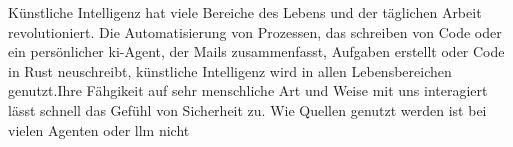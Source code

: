 \documentclass[../../main.text]{subfiles}
\begin{document}
\begin{onehalfspacing}
Künstliche Intelligenz hat viele Bereiche des Lebens und der täglichen Arbeit
revolutioniert. Die Automatisierung von Prozessen, das schreiben von Code
oder ein persönlicher \ac{ki}-Agent, der Mails zusammenfasst, Aufgaben erstellt
oder Code in Rust neuschreibt, künstliche Intelligenz wird in allen 
Lebensbereichen genutzt.Ihre Fähgikeit auf sehr menschliche Art und Weise 
mit uns interagiert lässt schnell das Gefühl von Sicherheit zu. Wie 
Quellen genutzt werden ist bei vielen Agenten oder \ac{llm} nicht

\end{onehalfspacing}
\end{document}
